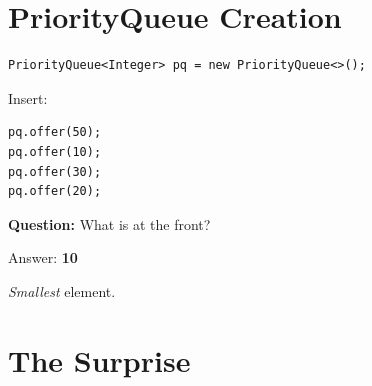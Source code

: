 \documentclass[11pt,a4paper]{book}
\newcommand{\question}[1]{
\vspace{0.5em}
\textbf{Question:} #1?
\vspace{0.2em}
}
\begin{document}
\section{PriorityQueue Creation}

\begin{verbatim} 
PriorityQueue<Integer> pq = new PriorityQueue<>();
\end{verbatim}
Insert:

\begin{verbatim} 
pq.offer(50);
pq.offer(10);
pq.offer(30);
pq.offer(20);
\end{verbatim}

\question{What is at the front}

Answer: {\ttfamily\textcolor{RosettaDeepGreen}{\textbf{10}}}

\emph{Smallest} element.
















\section{The Surprise}
\end{document}
